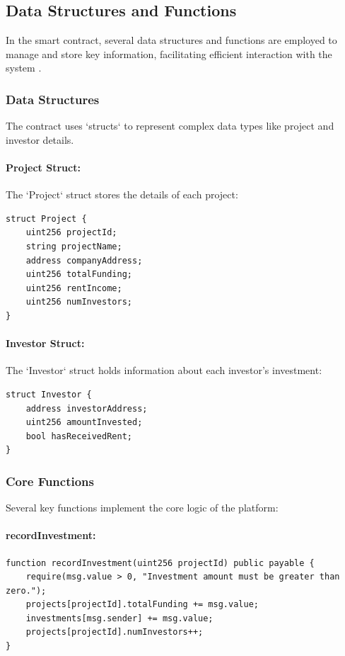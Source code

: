\subsection{Data Structures and Functions}

In the smart contract, several data structures and functions are employed to manage and store key information, facilitating efficient interaction with the system \cite{Dannen2017SoliditySmartContracts}.

\subsubsection{Data Structures}

The contract uses `structs` to represent complex data types like project and investor details.

\paragraph{Project Struct:}
The `Project` struct stores the details of each project:
\begin{verbatim}
struct Project {
    uint256 projectId;
    string projectName;
    address companyAddress;
    uint256 totalFunding;
    uint256 rentIncome;
    uint256 numInvestors;
}
\end{verbatim}

\paragraph{Investor Struct:}
The `Investor` struct holds information about each investor's investment:
\begin{verbatim}
struct Investor {
    address investorAddress;
    uint256 amountInvested;
    bool hasReceivedRent;
}
\end{verbatim}

\subsubsection{Core Functions}

Several key functions implement the core logic of the platform:

\paragraph{recordInvestment:}
\begin{verbatim}
function recordInvestment(uint256 projectId) public payable {
    require(msg.value > 0, "Investment amount must be greater than zero.");
    projects[projectId].totalFunding += msg.value;
    investments[msg.sender] += msg.value;
    projects[projectId].numInvestors++;
}
\end{verbatim}

